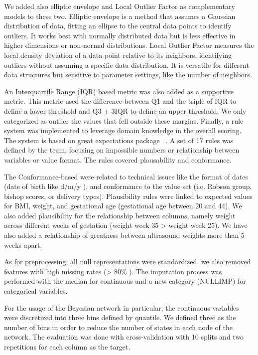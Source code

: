 We added also elliptic envelope and Local Outlier Factor as complementary models to these two. Elliptic envelope is a method that assumes a Gaussian distribution of data, fitting an ellipse to the central data points to identify outliers. It works best with normally distributed data but is less effective in higher dimensions or non-normal distributions. Local Outlier Factor measures the local density deviation of a data point relative to its neighbors, identifying outliers without assuming a specific data distribution. It is versatile for different data structures but sensitive to parameter settings, like the number of neighbors. 

An Interquartile Range (IQR) based metric was also added as a supportive metric. This metric used the difference between Q1 and the triple of IQR  to define a lower threshold and Q3 + 3IQR to define an upper threshold. We only categorized as outlier the values that fell outside these margins. Finally, a rule system was implemented to leverage domain knowledge in the overall scoring. The system is based on great expectations package \unskip~\cite{GXProactiveCollaborative}. A set of 17 rules was defined by the team, focusing on impossible numbers or relationship between variables  or value format. The rules covered plausability and conformance. 

The Conformance-based were related to technical issues like the format of dates (date of birth like d/m/y ), and conformance to the value set (i.e. Robson group, bishop scores, or delivery types). Plausibility rules were linked to expected values for BMI, weight, and gestational age (gestational age between 20 and 44). We also added plausibility for the relationship between columns, namely weight across different weeks of gestation (weight week 35 {\textgreater} weight week 25). We have also added a relationship of greatness between ultrasound weights more than 5 weeks apart. 

As for preprocessing, all null representations were standardized, we also removed features with high missing rates ({\textgreater} 80\% ). The imputation process was performed with the median for continuous and a new category (NULLIMP) for categorical variables.

For the usage of the Bayesian network in particular, the continuous variables were discretized into three bins defined by quantile. We defined three as the number of bins in order to reduce the number of states in each node of the network. The evaluation was done with cross-validation with 10 splits and two repetitions for each column as the target.

